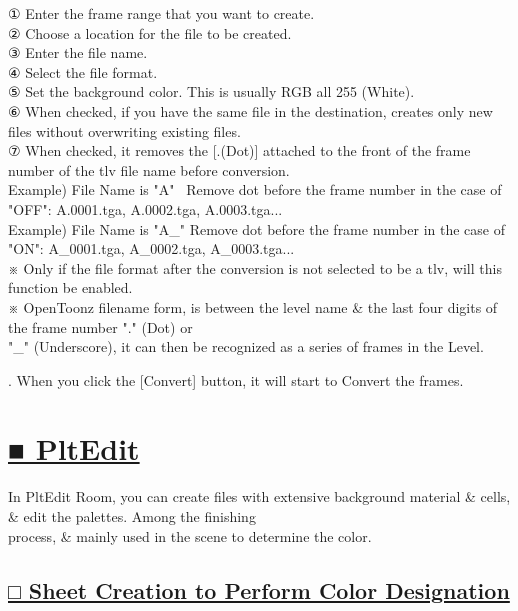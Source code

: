 \documentclass[a4paper,10pt]{article}
\begin{document}
\footnotesize
\noindent ① Enter the frame range that you want to create.\\
② Choose a location for the file to be created.\\
③ Enter the file name.\\
④ Select the file format.\\
⑤ Set the background color. This is usually RGB all 255 (White).\\
⑥ When checked, if you have the same file in the destination, creates only new files without overwriting existing files.\\
⑦ When checked, it removes the [.(Dot)] attached to the front of the frame number of the tlv file name before conversion.\\
Example) File Name is "A" \ Remove dot before the frame number in the case of "OFF": A.0001.tga, A.0002.tga, A.0003.tga...\\
Example) File Name is "A\_" Remove dot before the frame number in the case of "ON": A\_0001.tga, A\_0002.tga, A\_0003.tga...\\
※ Only if the file format after the conversion is not selected to be a tlv, will this function be enabled.\\
※ OpenToonz filename form, is between the level name \& the last four digits of the frame number "." (Dot) or\\
 "\_" (Underscore), it can then be recognized as  a series of frames in the Level.\\
\par
\normalsize
{}. When you click the [Convert] button, it will start to Convert the frames.

\newpage

\section*{\uline{■ PltEdit}}

\footnotesize
\noindent In PltEdit Room, you can create files with extensive background material \& cells, \& edit the palettes. Among the finishing\\
process, \& mainly used in the scene to determine the color.\\

\subsection*{\uline{□ Sheet Creation to Perform Color Designation}}
\end{document}
